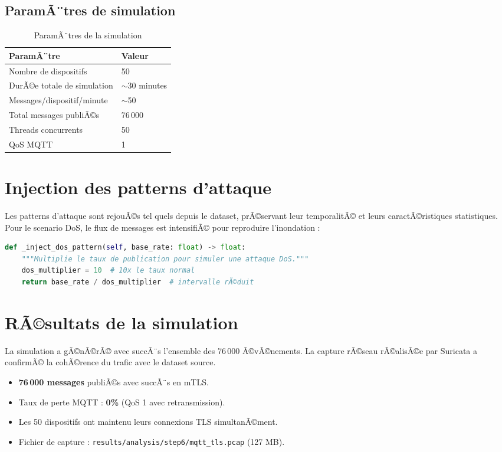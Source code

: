 \subsection{ParamÃ¨tres de simulation}

\begin{table}[H]
\centering
\caption{ParamÃ¨tres de la simulation}
\label{tab:sim_params}
\begin{tabular}{ll}
\toprule
\textbf{ParamÃ¨tre} & \textbf{Valeur} \\
\midrule
Nombre de dispositifs & 50 \\
DurÃ©e totale de simulation & $\sim$30 minutes \\
Messages/dispositif/minute & $\sim$50 \\
Total messages publiÃ©s & 76\,000 \\
Threads concurrents & 50 \\
QoS MQTT & 1 \\
\bottomrule
\end{tabular}
\end{table}

\section{Injection des patterns d'attaque}

Les patterns d'attaque sont rejouÃ©s tel quels depuis le dataset, prÃ©servant leur temporalitÃ© et leurs caractÃ©ristiques statistiques. Pour le scenario DoS, le flux de messages est intensifiÃ© pour reproduire l'inondation :

\begin{lstlisting}[language=python, caption=Injection du pattern DoS dans le simulateur]
def _inject_dos_pattern(self, base_rate: float) -> float:
    """Multiplie le taux de publication pour simuler une attaque DoS."""
    dos_multiplier = 10  # 10x le taux normal
    return base_rate / dos_multiplier  # intervalle rÃ©duit
\end{lstlisting}

\section{RÃ©sultats de la simulation}

La simulation a gÃ©nÃ©rÃ© avec succÃ¨s l'ensemble des 76\,000 Ã©vÃ©nements. La capture rÃ©seau rÃ©alisÃ©e par Suricata a confirmÃ© la cohÃ©rence du trafic avec le dataset source.

\begin{tcolorbox}[colback=green!5, colframe=green!50!black, title=RÃ©sultats de la simulation]
\begin{itemize}
  \item \textbf{76\,000 messages} publiÃ©s avec succÃ¨s en mTLS.
  \item Taux de perte MQTT : \textbf{0\%} (QoS 1 avec retransmission).
  \item Les 50 dispositifs ont maintenu leurs connexions TLS simultanÃ©ment.
  \item Fichier de capture : \texttt{results/analysis/step6/mqtt\_tls.pcap} (127 MB).
\end{itemize}
\end{tcolorbox}
